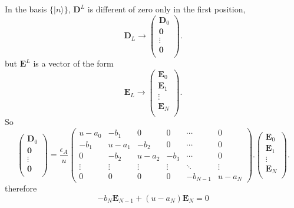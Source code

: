\documentclass[preprint,12pt]{revtex4}
\begin{document}
In the basis $\{|n\rangle\}$, $\mathbf D^L$ is different of zero only
in the first position,
\begin{equation}
\label{dl}
 \mathbf D_L \to
\left(
\begin{array}{c}
 \mathbf D_0 \\
 \mathbf 0 \\ 
 \vdots\\
 \mathbf 0 \\ 
\end{array}
\right). 
\end{equation}
 but $\mathbf E^L$  is a vector of the form
\begin{equation}
\label{el}
 \mathbf E_L \to
\left(
\begin{array}{c}
 \mathbf E_0 \\
 \mathbf E_1 \\ 
 \vdots\\
 \mathbf E_N \\ 
\end{array}
\right). 
\end{equation}
So
\begin{equation}
\label{consti}
\left(
\begin{array}{c}
 \mathbf D_0 \\
 \mathbf 0 \\ 
 \vdots\\
 \mathbf 0 \\ 
\end{array}
\right) = \frac{\epsilon_A}{u}
 \left(
\begin{array}{cccccc}
 u-a_0 & -b_1 & 0  & 0&\cdots & 0  \\
 -b_1 & u-a_1 & -b_2& 0& \cdots &0\\
 0   & -b_2 & u-a_2 & -b_3& \cdots &0\\
\vdots&\vdots& \vdots    &\vdots &\ddots &\vdots\\
 0  & 0 &0  &   0 & -b_{N-1}  & u-a_N
\end{array}
\right). 
\left(
\begin{array}{c}
 \mathbf E_0 \\
 \mathbf E_1 \\ 
 \vdots\\
 \mathbf E_N \\
\end{array}
\right). 
\end{equation}
therefore
\begin{equation}
-b_N \mathbf E_{N-1}  +(u-a_N)\mathbf E_N=0
\end{equation}
\end{document}
